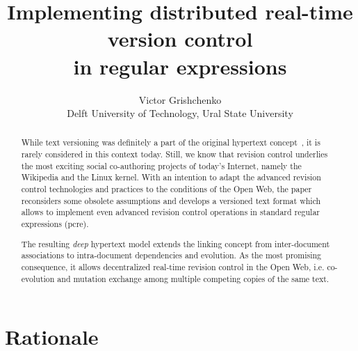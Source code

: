 \documentclass{acm_proc_article-sp}
\date{}
\begin{document}
\title{ Implementing distributed real-time version control \\in regular expressions }

\author{Victor Grishchenko \\ \small Delft University of Technology, Ural State University }

\maketitle

\begin{abstract}
While text versioning was definitely a part of the original
hypertext concept~\cite{xanadu}, it is rarely considered in
this context today.
Still, we know that revision control underlies the most exciting
social co-authoring projects of today's Internet, namely the
Wikipedia and the Linux kernel. With an intention to adapt the
advanced revision control technologies and practices to the
conditions of the Open Web, the paper reconsiders some obsolete
assumptions and develops a versioned text format which allows to
implement even advanced revision control operations in standard
regular expressions (pcre).

The resulting \emph{deep} hypertext model extends the linking
concept from inter-document associations to intra-document
dependencies and evolution. As the most promising consequence,
it allows decentralized real-time revision control in the Open
Web, i.e. co-evolution and mutation exchange among multiple
competing copies of the same text. 

\end{abstract}


\section{Rationale}
\end{document}

